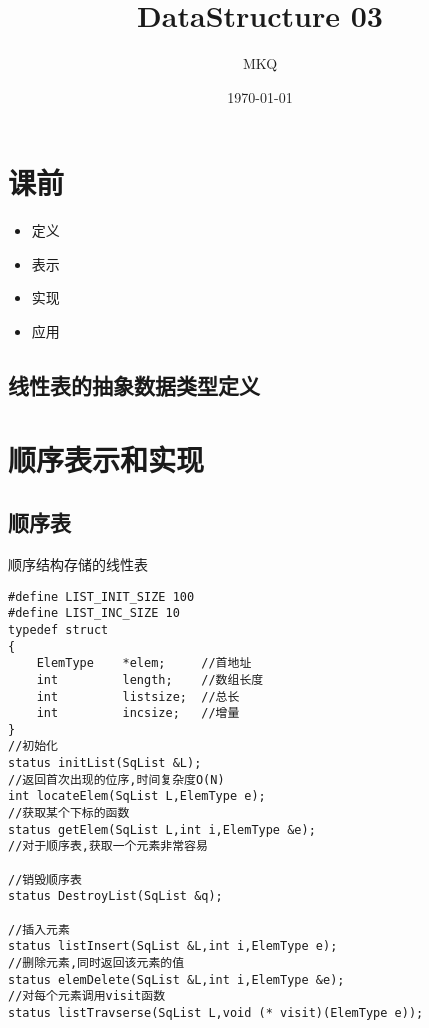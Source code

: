 \documentclass[11pt]{article}
\author{MKQ}
\date{\today}
\title{DataStructure 03}
\begin{document}
\maketitle
\tableofcontents

\section{课前}
\label{sec:org7682b89}
\begin{itemize}
\item 定义
\item 表示
\item 实现
\item 应用
\end{itemize}
\subsection{线性表的抽象数据类型定义}
\label{sec:org23266e8}
\section{顺序表示和实现}
\label{sec:org64dacc0}
\subsection{顺序表}
\label{sec:org3cf7e3d}
顺序结构存储的线性表
\begin{verbatim}
#define LIST_INIT_SIZE 100
#define LIST_INC_SIZE 10
typedef struct
{
    ElemType    *elem;     //首地址
    int         length;    //数组长度
    int         listsize;  //总长
    int         incsize;   //增量
}
//初始化
status initList(SqList &L);
//返回首次出现的位序,时间复杂度O(N)
int locateElem(SqList L,ElemType e);
//获取某个下标的函数
status getElem(SqList L,int i,ElemType &e);
//对于顺序表,获取一个元素非常容易

//销毁顺序表
status DestroyList(SqList &q);

//插入元素
status listInsert(SqList &L,int i,ElemType e);
//删除元素,同时返回该元素的值
status elemDelete(SqList &L,int i,ElemType &e);
//对每个元素调用visit函数
status listTravserse(SqList L,void (* visit)(ElemType e));
\end{verbatim}
\end{document}
